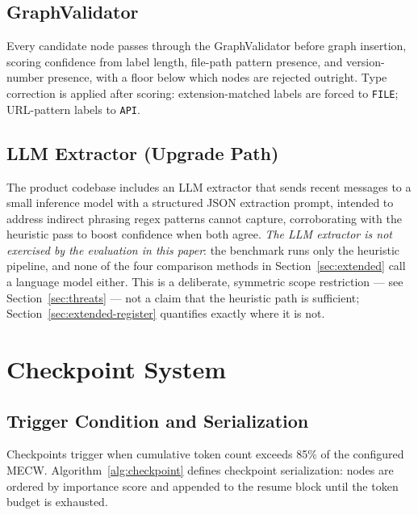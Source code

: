 \documentclass[journal]{IEEEtran}
\begin{document}
\subsection{GraphValidator}

Every candidate node passes through the GraphValidator before
graph insertion, scoring confidence from label length, file-path
pattern presence, and version-number presence, with a floor
below which nodes are rejected outright.
Type correction is applied after scoring: extension-matched
labels are forced to \texttt{FILE}; URL-pattern labels to
\texttt{API}.

\subsection{LLM Extractor (Upgrade Path)}
\label{sec:llm-extractor}

The product codebase includes an LLM extractor that sends
recent messages to a small inference model with a structured
JSON extraction prompt, intended to address indirect phrasing
regex patterns cannot capture, corroborating with the
heuristic pass to boost confidence when both agree.
\textit{The LLM extractor is not exercised by the evaluation in
this paper}: the benchmark runs only the heuristic pipeline,
and none of the four comparison methods in
Section~\ref{sec:extended} call a language model either.
This is a deliberate, symmetric scope restriction --- see
Section~\ref{sec:threats} --- not a claim that the heuristic
path is sufficient; Section~\ref{sec:extended-register}
quantifies exactly where it is not.

\section{Checkpoint System}
\label{sec:checkpoint}

\subsection{Trigger Condition and Serialization}

Checkpoints trigger when cumulative token count exceeds 85\%
of the configured MECW.
Algorithm~\ref{alg:checkpoint} defines checkpoint serialization:
nodes are ordered by importance score and appended to the
resume block until the token budget is exhausted.
\end{document}
